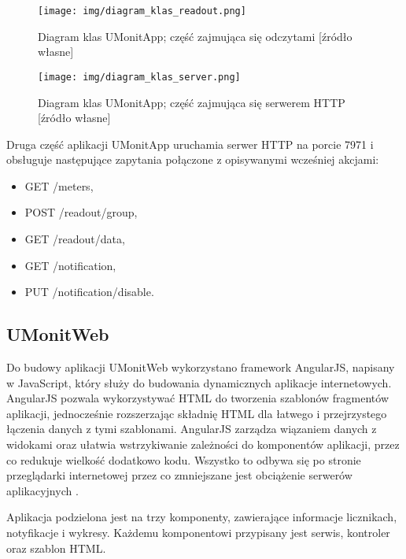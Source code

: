 \begin{figure}[H]
	\centering
	\texttt{[image: img/diagram\_klas\_readout.png]}
	\caption[Diagram klas UMonitApp; część zajmująca się odczytami]{Diagram klas UMonitApp; część zajmująca się odczytami [źródło własne]}
	\label{fig:class_diagram_umonitapp_readouts}
\end{figure}

\begin{figure}[H]
	\centering
	\texttt{[image: img/diagram\_klas\_server.png]}
	\caption[Diagram klas UMonitApp; część zajmująca się serwerem HTTP]{Diagram klas UMonitApp; część zajmująca się serwerem HTTP [źródło własne]}
	\label{fig:class_diagram_umonitapp_server}
\end{figure}

Druga część aplikacji UMonitApp uruchamia serwer HTTP na porcie 7971 i obsługuje następujące zapytania połączone z opisywanymi wcześniej akcjami:
\begin{itemize}
	\itemsep 0em
	\item GET /meters,
	\item POST /readout/group,
	\item GET /readout/data,
	\item GET /notification,
	\item PUT /notification/disable.
\end{itemize}

\subsection{UMonitWeb} %
\label{sub:umonitweb}

Do budowy aplikacji UMonitWeb wykorzystano framework AngularJS, napisany w JavaScript, który służy do budowania dynamicznych aplikacje internetowych.
AngularJS pozwala wykorzystywać HTML do tworzenia szablonów fragmentów aplikacji, jednocześnie rozszerzając składnię HTML dla łatwego i przejrzystego łączenia danych z tymi szablonami.
AngularJS zarządza wiązaniem danych z widokami oraz ułatwia wstrzykiwanie zależności do komponentów aplikacji, przez co redukuje wielkość dodatkowo kodu.
Wszystko to odbywa się po stronie przeglądarki internetowej przez co zmniejszane jest obciążenie serwerów aplikacyjnych \cite{what_is_angular}.

Aplikacja podzielona jest na trzy komponenty, zawierające informacje licznikach, notyfikacje i wykresy.
Każdemu komponentowi przypisany jest serwis, kontroler oraz szablon HTML.

